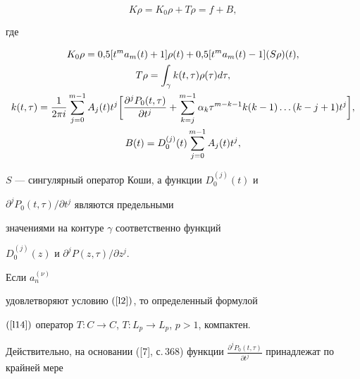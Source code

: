 \begin{equation}


\label{l13}


K\rho=K_0\rho+T\rho=f+B,


\end{equation}


где


\begin{gather}


K_0\rho=0{,}5[t^ma_m(t)+1]\rho(t)+0{,}5[t^ma_m(t)-1](S\rho)(t),\notag\\


\label{l14}


T\rho=\int_\gamma k(t,\tau)\rho(\tau)d\tau,\\


%


k(t,\tau)=\frac{1}{2\pi i}\sum_{j=0}^{m-1} A_j(t)t^j\bigg[


\frac{\partial^j P_0(t,\tau)}{\partial t^j} +


\sum_{k=j}^{m-1} \alpha_k\tau^{m-k-1} k(k-1)\dotsc (k-j+1)t^j


\bigg],\notag \\


%


\label{l15}


B(t)=D_0^{(j)}(t)\sum_{j=0}^{m-1} A_j(t)t^j,


\end{gather}


$S$ --- сингулярный оператор Коши, а функции $D_0^{(j)}(t)$ и


$\partial^j P_0(t,\tau)/\partial t^j$ являются предельными


значениями на контуре $\gamma$ соответственно функций


$D_0^{(j)}(z)$ и $\partial^j P(z,\tau)/\partial z^j$.








\begin{lem}


Если $a_n^{(\nu)}$


удовлетворяют условию $(\ref{l2})$, то определенный формулой


$(\ref{l14})$ оператор $T:C\to C$, $T:L_p \to L_p$, $p>1$, компактен.


\end{lem}





Действительно, на основании ([7], с.\,368) функции $\frac{\partial^j


P_0(t,\tau)}{\partial t^j}$ принадлежат по крайней мере


